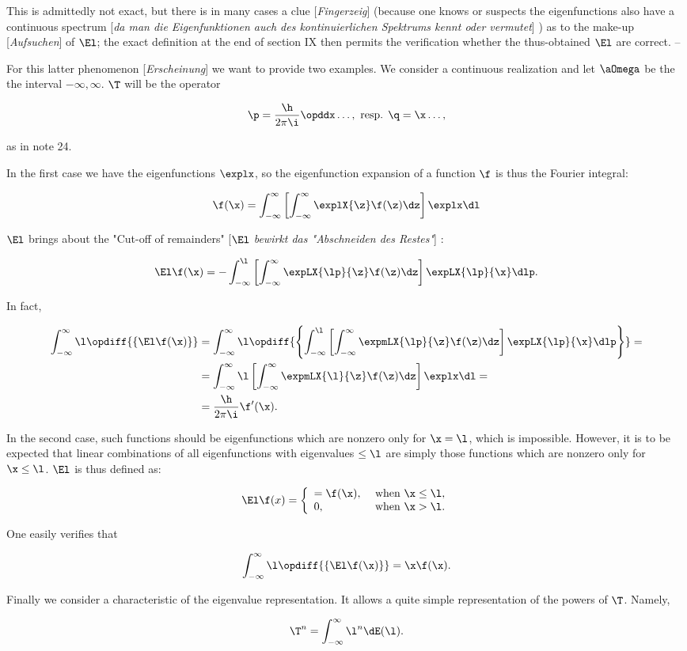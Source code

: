 \documentclass{article}
\newcommand{\WTF}[1]{
[\it{\small{#1}}]
}
\newcommand{\uequ}[1]{
\begin{align*}
#1
\end{align*}
}
\newcommand{\primed}[1]{{#1^{\prime}}}
\renewcommand{\it}[1]{\textit{#1}}
\newcommand{\intXY}[2]{\int_{#1}^{#2}}
\begin{document}
This is admittedly not exact, but there is in many cases a clue\WTF{Fingerzeig} (because one knows or suspects the eigenfunctions also have a continuous spectrum\WTF{da man die Eigenfunktionen auch des kontinuierlichen Spektrums kennt oder vermutet}) as to the make-up\WTF{Aufsuchen} of $\El$; the exact definition at the end of section IX then permits the verification whether the thus-obtained $\El$ are correct. --

For this latter phenomenon\WTF{Erscheinung} we want to provide two examples. We consider a continuous realization and let $\aOmega$ be the the interval $-\infty,\infty$. $\T$ will be the operator
\uequ{
\p = \frac{\h}{2\pi\i}\opddx\dots, \text{ resp. } \q = \x\dots,
}
as in note 24.

In the first case we have the eigenfunctions $\explx$, so the eigenfunction expansion of a function $\f$ is thus the Fourier integral:
\uequ{
\f(\x) = \intXY{-\infty}{\infty}\left[
\intXY{-\infty}{\infty}\explX{\z}\f(\z)\dz
\right]\explx\dl
}
$\El$ brings about the "Cut-off of remainders"\WTF{$\El$ bewirkt das "Abschneiden des Restes"}:
\uequ{
\El\f(\x) = -\intXY{-\infty}{\l}\left[
\intXY{-\infty}{\infty}\expLX{\lp}{\z}\f(\z)\dz
\right]\expLX{\lp}{\x}\dlp.
}

In fact,
\uequ{
\intXY{-\infty}{\infty}\l\opdiff{\lbrace\El\f(\x)\rbrace} &=
\intXY{-\infty}{\infty}\l\opdiff{\left\{
\intXY{-\infty}{\l}\left[
\intXY{-\infty}{\infty}\expmLX{\lp}{\z}\f(\z)\dz
\right]\expLX{\lp}{\x}\dlp
\right\}} = \\
 &= \intXY{-\infty}{\infty}\l\left[
   \intXY{-\infty}{\infty}\expmLX{\l}{\z}\f(\z)\dz
 \right]\explx\dl = \\
 &= \frac{\h}{2\pi\i}\primed{\f}(\x).
}

In the second case, such functions should be eigenfunctions which are nonzero only for $\x=\l$, which is impossible. However, it is to be expected that linear combinations of all eigenfunctions with eigenvalues $\leq \l$ are simply those functions which are nonzero only for $\x \leq \l$. $\El$ is thus defined as:
\uequ{
\El\f(x) = \left\{
     \begin{array}{lr}
       = \f(\x), & \text{ when } \x \leq \l, \\
       0, & \text{ when } \x > \l.
     \end{array}
   \right.
}

One easily verifies that
\uequ{
\intXY{-\infty}{\infty}\l\opdiff{\lbrace\El\f(\x)\rbrace} = \x\f(\x).
}

Finally we consider a characteristic of the eigenvalue representation. It allows a quite simple representation of the powers of $\T$. Namely,
\uequ{
\T^n = \intXY{-\infty}{\infty}\l^n\dE(\l).
}
\end{document}
